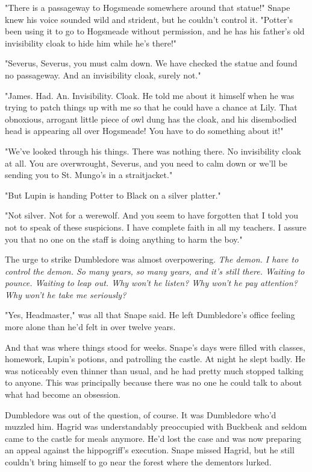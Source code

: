\documentclass[a4paper,11pt]{article}
\begin{document}
"There is a passageway to Hogsmeade somewhere around that statue!" Snape knew his voice sounded wild and strident, but he couldn't control it. "Potter's been using it to go to Hogsmeade without permission, and he has his father's old invisibility cloak to hide him while he's there!"

"Severus, Severus, you must calm down. We have checked the statue and found no passageway. And an invisibility cloak, surely not."

"James. Had. An. Invisibility. Cloak. He told me about it himself when he was trying to patch things up with me so that he could have a chance at Lily. That obnoxious, arrogant little piece of owl dung has the cloak, and his disembodied head is appearing all over Hogsmeade! You have to do something about it!"

"We've looked through his things. There was nothing there. No invisibility cloak at all. You are overwrought, Severus, and you need to calm down or we'll be sending you to St. Mungo's in a straitjacket."

"But Lupin is handing Potter to Black on a silver platter."

"Not silver. Not for a werewolf. And you seem to have forgotten that I told you not to speak of these suspicions. I have complete faith in all my teachers. I assure you that no one on the staff is doing anything to harm the boy."

The urge to strike Dumbledore was almost overpowering. \emph{The demon. I have to control the demon. So many years, so many years, and it's still there. Waiting to pounce. Waiting to leap out. Why won't he listen? Why won't he pay attention? Why won't he take me seriously?}

"Yes, Headmaster," was all that Snape said. He left Dumbledore's office feeling more alone than he'd felt in over twelve years.

And that was where things stood for weeks. Snape's days were filled with classes, homework, Lupin's potions, and patrolling the castle. At night he slept badly. He was noticeably even thinner than usual, and he had pretty much stopped talking to anyone. This was principally because there was no one he could talk to about what had become an obsession.

Dumbledore was out of the question, of course. It was Dumbledore who'd muzzled him. Hagrid was understandably preoccupied with Buckbeak and seldom came to the castle for meals anymore. He'd lost the case and was now preparing an appeal against the hippogriff's execution. Snape missed Hagrid, but he still couldn't bring himself to go near the forest where the dementors lurked.
\end{document}

